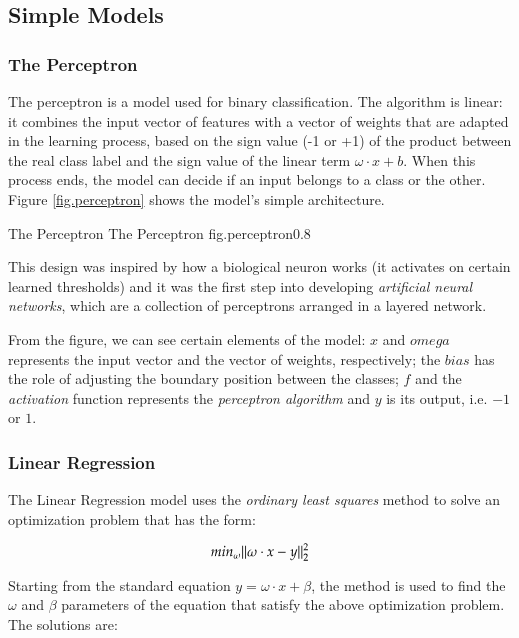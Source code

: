 \subsection{Simple Models}

\subsubsection{The Perceptron}

The perceptron is a model used for binary classification. The algorithm is linear: 
it combines the input vector of features with a vector of weights that are 
adapted in the learning process, based on the sign value (-1 or +1) of the product 
between the real class label and the sign value of the linear term $\omega \cdot x + b$. 
When this process ends, the model can decide if an input belongs to a class or 
the other. Figure \ref{fig.perceptron} shows the model's simple architecture. 

%
    {The Perceptron}%
    {The Perceptron}%
    {fig.perceptron}{0.8}

This design was inspired by how a biological neuron works (it activates on 
certain learned thresholds) and it was the first step into developing 
{\it artificial neural networks}, which are a collection of perceptrons 
arranged in a layered network. 

From the figure, we can see certain elements of the model: $x$ and $omega$ 
represents the input vector and the vector of weights, respectively; the $bias$ 
has the role of adjusting the boundary position between the classes; $f$ and 
the {\it activation} function represents the {\it perceptron algorithm} 
and $y$ is its output, i.e. $-1$ or $1$. 


\subsubsection{Linear Regression}

The Linear Regression model uses the {\it ordinary least squares} method to 
solve an optimization problem that has the form:

\begin{equation}
\centering
min_{\omega} \| \omega \cdot x - y \|_{2}^{2}
\label{opt_pb}
\end{equation}

Starting from the standard equation $y = \omega \cdot x + \beta$, the method  
is used to find the $\omega$ and $\beta$ parameters of the equation that satisfy 
the above optimization problem. The solutions are:

